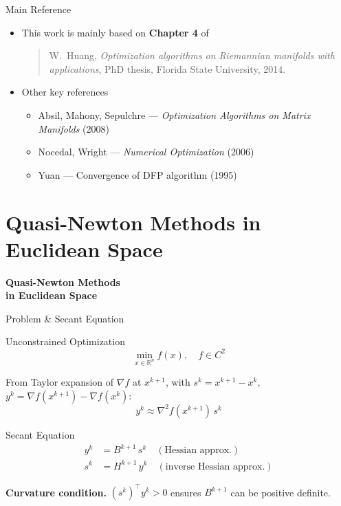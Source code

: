 \documentclass[10pt,aspectratio=169]{beamer}
\newcommand{\RR}{\mathbb{R}}
\begin{document}
\begin{frame}{Main Reference}
\begin{itemize}
    \item This work is mainly based on \textbf{Chapter 4} of
    \begin{quote}
    W.\ Huang, \emph{Optimization algorithms on Riemannian manifolds with applications}, PhD thesis, Florida State University, 2014.
    \end{quote}
    \item Other key references
    \begin{itemize}
        \item Absil, Mahony, Sepulchre — \emph{Optimization Algorithms on Matrix Manifolds} (2008)
        \item Nocedal, Wright — \emph{Numerical Optimization} (2006)
        \item Yuan — Convergence of DFP algorithm (1995)
    \end{itemize}
\end{itemize}
\end{frame}

\section{Quasi-Newton Methods in Euclidean Space}

\begin{frame}{}
\centering
\vfill
{\Huge\bfseries Quasi-Newton Methods\\[0.3cm] in Euclidean Space}
\vfill
\end{frame}

\begin{frame}{Problem \& Secant Equation}
\begin{block}{Unconstrained Optimization}
$$\min_{x\in\RR^n} f(x), \quad f\in C^2$$
\end{block}
\medskip
From Taylor expansion of $\nabla f$ at $x^{k+1}$, with $s^k = x^{k+1}-x^k$, $y^k = \nabla f(x^{k+1})-\nabla f(x^k)$:
$$y^k \approx \nabla^2 f(x^{k+1})\,s^k$$
\begin{block}{Secant Equation}
\vspace{-0.3cm}
\begin{align*}
    y^k &= B^{k+1}\,s^k \quad(\text{Hessian approx.})\\
    s^k &= H^{k+1}\,y^k \quad(\text{inverse Hessian approx.})
\end{align*}
\end{block}
\textbf{Curvature condition.} $(s^k)^\top y^k > 0$ ensures $B^{k+1}$ can be positive definite.
\end{frame}
\end{document}
